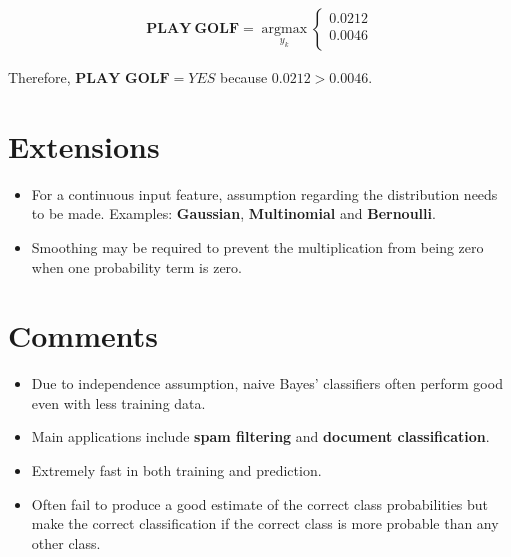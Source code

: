 \documentclass[11pt, a4paper]{article}
\begin{document}
\begin{align*}
	\mathbf{PLAY\ GOLF} = \operatorname*{argmax}_{y_k}\left\{ 
	\begin{array}{ll}                                         
	0.0212                                                    
	                                                          \\
	0.0046                                                    \\
	\end{array}                                               
	\right.                                                   
\end{align*}

Therefore, $\textbf{PLAY\ GOLF}=YES$ because $0.0212 > 0.0046$.

\section{Extensions} 

\begin{itemize}
	\item For a continuous input feature, assumption regarding the distribution needs to be made. Examples: \textbf{Gaussian}, \textbf{Multinomial} and \textbf{Bernoulli}. 
	\item Smoothing may be required to prevent the multiplication from being zero when one probability term is zero.
\end{itemize}

\section{Comments}
\begin{itemize}
	\item Due to independence assumption, naive Bayes' classifiers often perform good even with less training data.
	\item Main applications include \textbf{spam filtering} and \textbf{document classification}.
	\item Extremely fast in both training and prediction.
	\item Often fail to produce a good estimate of the correct class probabilities but make the correct classification if the correct class is more probable than any other class.
\end{itemize}
\end{document}
